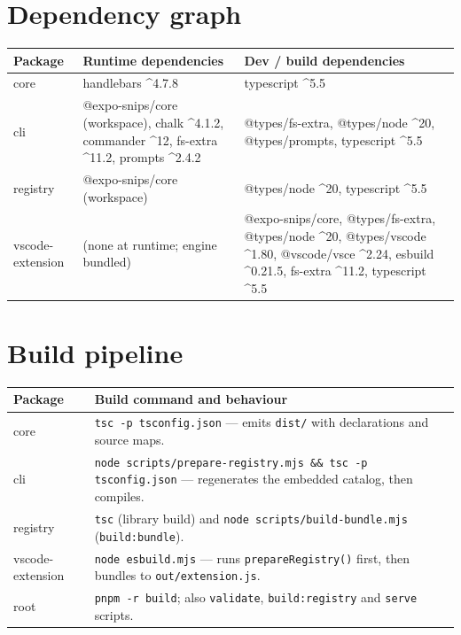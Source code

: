 \section{Dependency graph}

\begin{table}[H]
\centering
\caption{Runtime and build dependencies}
\begin{longtable}{p{3.6cm}p{4.6cm}p{5.8cm}}
\toprule
\textbf{Package} & \textbf{Runtime dependencies} & \textbf{Dev / build dependencies} \\
\midrule
\endhead
core & handlebars \^{}4.7.8 & typescript \^{}5.5 \\
cli & @expo-snips/core (workspace), chalk \^{}4.1.2, commander \^{}12, fs-extra \^{}11.2, prompts \^{}2.4.2 & @types/fs-extra, @types/node \^{}20, @types/prompts, typescript \^{}5.5 \\
registry & @expo-snips/core (workspace) & @types/node \^{}20, typescript \^{}5.5 \\
vscode-extension & (none at runtime; engine bundled) & @expo-snips/core, @types/fs-extra, @types/node \^{}20, @types/vscode \^{}1.80, @vscode/vsce \^{}2.24, esbuild \^{}0.21.5, fs-extra \^{}11.2, typescript \^{}5.5 \\
\bottomrule
\end{longtable}
\end{table}

\section{Build pipeline}

\begin{longtable}{p{4cm}p{10cm}}
\toprule
\textbf{Package} & \textbf{Build command and behaviour} \\
\midrule
\endhead
core & \texttt{tsc -p tsconfig.json} --- emits \texttt{dist/} with declarations and source maps. \\
cli & \texttt{node scripts/prepare-registry.mjs \&\& tsc -p tsconfig.json} --- regenerates the embedded catalog, then compiles. \\
registry & \texttt{tsc} (library build) and \texttt{node scripts/build-bundle.mjs} (\texttt{build:bundle}). \\
vscode-extension & \texttt{node esbuild.mjs} --- runs \texttt{prepareRegistry()} first, then bundles to \texttt{out/extension.js}. \\
root & \texttt{pnpm -r build}; also \texttt{validate}, \texttt{build:registry} and \texttt{serve} scripts. \\
\bottomrule
\end{longtable}


